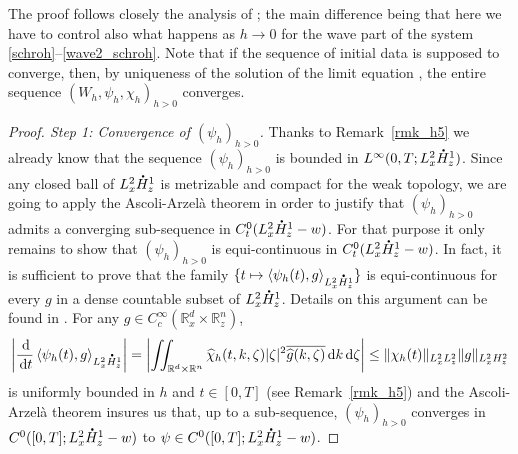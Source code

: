 \documentclass[10pt]{amsart}
\newcommand\mto{\mathchoice{\longmapsto}{\mapsto}{\mapsto}{\mapsto}}
\let\hat\oldhat
\theoremstyle{definition}
\newcommand*{\overbigdot}[1]{%
\accentset{\mbox{\large\bfseries .}}{#1}}
\let\hat\widehat
\newcommand{\R}{\mathbb{R}}
\newcommand{\ud}{\, {\mathrm{d}}}
\begin{document}
The proof follows closely the analysis of \cite{Lions_Paul_Wigner};
the main difference being that here we have to control also what happens as $h\to 0$ for the wave part of the system \eqref{schroh}--\eqref{wave2_schroh}.
Note that if the sequence of initial data is supposed to converge, then, by uniqueness of the solution of the limit equation \cite[Th.\,4]{dBGV}, the entire sequence
$(W_{h}, \psi_{h},\chi_{h})_{h>0}$ converges.

\begin{proof}[Proof. Step 1: Convergence of $(\psi_{h})_{h>0}$]
Thanks to Remark~\ref{rmk_h5} we already know that the sequence $(\psi_{h})_{h>0}$ is bounded in $L^{\infty}(0,T;L_{x}^{2}\overbigdot{H}_{z}^{1})$. Since any closed ball of $L_{x}^{2}\overbigdot{H}_{z}^{1}$ is metrizable and compact for the weak topology, we are going to apply the Ascoli-Arzelà theorem in order to justify that $(\psi_{h})_{h>0}$ admits a converging sub-sequence in $C_{t}^{0}(L_{x}^{2}\overbigdot{H}_{z}^{1}-w)$. For that purpose it only remains to show that $(\psi_{h})_{h>0}$ is equi-continuous in $C_{t}^{0}(L_{x}^{2}\overbigdot{H}_{z}^{1}-w)$. In fact, it is sufficient to prove that the family $\{t\mto \langle \psi_{h}(t),g\rangle_{L_{x}^{2}\overbigdot{H}_{z}^{1}}\}$ is equi-continuous for every $g$ in a dense countable subset of $L_{x}^{2}\overbigdot{H}_{z}^{1}$. Details on this argument can be found \eg in \cite[App.\,C]{PLL}.
For any $g\in C_{c}^{\infty}(\R_{x}^{d}\times\R_{z}^{n})$,
\[
\left|\frac{\ud}{\ud t}\left\langle\psi_{h}(t),g\right\rangle_{L_{x}^{2}\overbigdot{H}_{z}^{1}}\right|=\left|\iint_{\R^{d}\times\R^{n}}\hat{\chi}_{h}(t,k,\zeta)|\zeta|^{2}\overline{\hat{g}(k,\zeta)}\ud k\ud\zeta\right|\leq\|\chi_{h}(t)\|_{L_{x}^{2}L_{z}^{2}}\|g\|_{L_{x}^{2}H_{z}^{2}}
\]
is uniformly bounded in $h$ and $t\in[0,T]$ (see Remark~\ref{rmk_h5}) and the Ascoli-Arzelà theorem insures us that, up to a sub-sequence, $(\psi_{h})_{h>0}$ converges in \hbox{$C^{0}([0,T];L_{x}^{2}\overbigdot{H}_{z}^{1}-w)$} to $\psi\in C^{0}([0,T];L_{x}^{2}\overbigdot{H}_{z}^{1}-w)$.


\end{proof}
\end{document}

